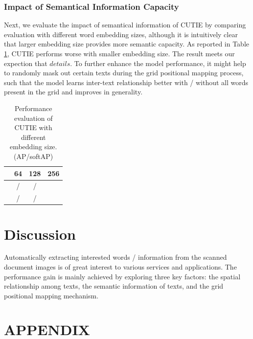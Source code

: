 \documentclass[10pt,twocolumn,letterpaper]{article}
\begin{document}
\subsubsection{Impact of Semantical Information Capacity}
Next, we evaluate the impact of semantical information of CUTIE by comparing evaluation with different word embedding sizes, although it is intuitively clear that larger embedding size provides more semantic capacity. As reported in Table \ref{tab:embedding}, CUTIE performs worse with smaller embedding size. The result meets our expection that $details$. To further enhance the model performance, it might help to randomly mask out certain texts during the grid positional mapping process, such that the model learns inter-text relationship better with / without all words present in the grid and improves in generality.
\begin{table}
	\caption{Performance evaluation of CUTIE with different embedding size. (AP/softAP)}
\begin{center}
\begin{tabular}{l | c | c | c}
	 & 64 & 128 & 256 \\
	\hline
	 & / & / & \\
	 & / & / & \\
\end{tabular}
\end{center}
	\label{tab:embedding}
\end{table}


\section{Discussion}
Automatically extracting interested words / information from the scanned document images is of great interest to various services and applications. The performance gain is mainly achieved by exploring three key factors: the spatial relationship among texts, the semantic information of texts, and the grid positional mapping mechanism.

{\small


}

\section{APPENDIX}
\end{document}
